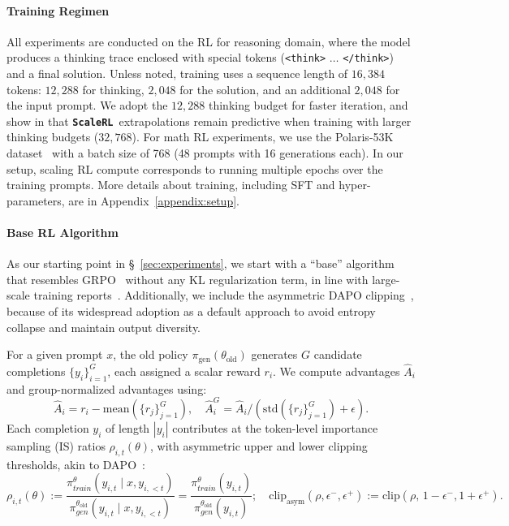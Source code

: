 \documentclass[]{fairmeta} %
\newcommand{\scalerl}{\texttt{\textbf{ScaleRL}}}
\begin{document}
\paragraph{Training Regimen}
All experiments are conducted on the RL for reasoning domain, where the model produces a thinking trace enclosed with special tokens (\texttt{<think>} $\ldots$ \texttt{</think>}) and a final solution. Unless noted, training uses a sequence length of $16,384$ tokens: $12,288$ for thinking, $2,048$ for the solution, and an additional $2,048$ for the input prompt. We adopt the $12,288$ thinking budget for faster iteration, and show in  that \scalerl\ extrapolations remain predictive when training with larger thinking budgets ($32,768$). For math RL experiments, we use the Polaris-53K dataset~\citep{polaris2025} with a batch size of 768 (48 prompts with 16 generations each). %
In our setup, scaling RL compute corresponds to running multiple epochs over the training prompts. More details about training, including SFT and hyper-parameters, are in Appendix~\ref{appendix:setup}.


\paragraph{Base RL Algorithm}
As our starting point in \S~\ref{sec:experiments}, we start with a ``base'' algorithm that resembles GRPO~\citep{shao2024deepseekmath} without any KL regularization term, in line with large-scale training reports~\citep{rastogi2025magistral,minimax_m1}. Additionally, we include the asymmetric DAPO clipping~\citep{yu2025dapo}, because of its widespread adoption as a default approach to avoid entropy collapse and maintain output diversity. 

For a given prompt $x$, the old policy $\pi_{\text{gen}}(\theta_{\text{old}})$ generates $G$ candidate completions $\{y_i\}_{i=1}^G$, each assigned a scalar reward $r_i$. 
We compute advantages $\hat{A}_i$ and group-normalized advantages using:
\begin{equation*}
    \hat{A}_i = r_i - \mathrm{mean}(\{r_j\}_{j=1}^G),  \quad
    \hat{A}_i^{G} = \hat{A}_i/(\mathrm{std}(\{r_j\}_{j=1}^G) + \epsilon).
\end{equation*}
Each completion $y_i$ of length $|y_i|$ contributes at the token-level importance sampling (IS) ratios $\rho_{i,t}(\theta)$, with asymmetric upper and lower clipping thresholds, akin to DAPO~\citep{yu2025dapo}:
\begin{equation}
    \rho_{i,t}(\theta) := \frac{\pi^\theta_{train}(y_{i,t} \mid x, y_{i,<t})}{\pi^{\theta_{\text{old}}}_{gen}(y_{i,t} \mid x, y_{i,<t})} = \frac{\pi^\theta_{train}(y_{i,t})}{\pi^{\theta_{\text{old}}}_{gen}(y_{i,t})}; \quad \mathrm{clip}_{\mathrm{asym}}(\rho, \epsilon^-, \epsilon^+) := \mathrm{clip}(\rho,\, 1-\epsilon^-, 1+\epsilon^+).
    \label{eq:is}
\end{equation}
\end{document}
